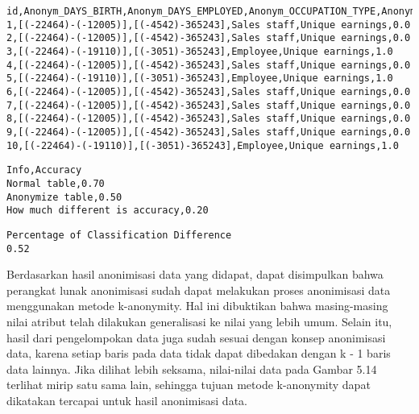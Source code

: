 \begin{lstlisting}[basicstyle=\ttfamily, frame=single,
	columns=fullflexible, keepspaces=true, breaklines=true, label=lst:fungsional_naivebayes2, caption=Hasil Klasifikasi Naive Bayes Setelah Anonimisasi]
id,Anonym_DAYS_BIRTH,Anonym_DAYS_EMPLOYED,Anonym_OCCUPATION_TYPE,Anonym_NAME_INCOME_TYPE,prediction
1,[(-22464)-(-12005)],[(-4542)-365243],Sales staff,Unique earnings,0.0
2,[(-22464)-(-12005)],[(-4542)-365243],Sales staff,Unique earnings,0.0
3,[(-22464)-(-19110)],[(-3051)-365243],Employee,Unique earnings,1.0
4,[(-22464)-(-12005)],[(-4542)-365243],Sales staff,Unique earnings,0.0
5,[(-22464)-(-19110)],[(-3051)-365243],Employee,Unique earnings,1.0
6,[(-22464)-(-12005)],[(-4542)-365243],Sales staff,Unique earnings,0.0
7,[(-22464)-(-12005)],[(-4542)-365243],Sales staff,Unique earnings,0.0
8,[(-22464)-(-12005)],[(-4542)-365243],Sales staff,Unique earnings,0.0
9,[(-22464)-(-12005)],[(-4542)-365243],Sales staff,Unique earnings,0.0
10,[(-22464)-(-19110)],[(-3051)-365243],Employee,Unique earnings,1.0
\end{lstlisting}

\begin{lstlisting}[basicstyle=\ttfamily, frame=single,
	columns=fullflexible, keepspaces=true, breaklines=true, label=lst:fungsional_naivebayes3, caption=Perbedaan Tingkat Akurasi]
Info,Accuracy
Normal table,0.70
Anonymize table,0.50
How much different is accuracy,0.20
\end{lstlisting}

\begin{lstlisting}[basicstyle=\ttfamily, frame=single,
	columns=fullflexible, keepspaces=true, breaklines=true, label=lst:fungsional_naivebayes4, caption=Perbedaan Persentase Hasil Klasifikasi (\%)]
Percentage of Classification Difference
0.52
\end{lstlisting}
\vspace{0.5cm}
Berdasarkan hasil anonimisasi data yang didapat, dapat disimpulkan bahwa perangkat lunak anonimisasi sudah dapat melakukan proses anonimisasi data menggunakan metode k-anonymity. Hal ini dibuktikan bahwa masing-masing nilai atribut telah dilakukan generalisasi ke nilai yang lebih umum. Selain itu, hasil dari pengelompokan data juga sudah sesuai dengan konsep anonimisasi data, karena setiap baris pada data tidak dapat dibedakan dengan k - 1 baris data lainnya. Jika dilihat lebih seksama, nilai-nilai data pada Gambar 5.14 terlihat mirip satu sama lain, sehingga tujuan metode k-anonymity dapat dikatakan tercapai untuk hasil anonimisasi data.

